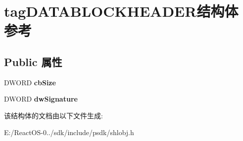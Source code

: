 \hypertarget{structtag_d_a_t_a_b_l_o_c_k_h_e_a_d_e_r}{}\section{tag\+D\+A\+T\+A\+B\+L\+O\+C\+K\+H\+E\+A\+D\+E\+R结构体 参考}
\label{structtag_d_a_t_a_b_l_o_c_k_h_e_a_d_e_r}
\subsection*{Public 属性}
\begin{DoxyCompactItemize}
\item 
\mbox{\label{structtag_d_a_t_a_b_l_o_c_k_h_e_a_d_e_r_a5060cbb80aae02e0176b8524fcfbf36a}} 
D\+W\+O\+RD {\bfseries cb\+Size}
\item 
\mbox{\label{structtag_d_a_t_a_b_l_o_c_k_h_e_a_d_e_r_a416862ce00e57edc1bfd2911d2003f2d}} 
D\+W\+O\+RD {\bfseries dw\+Signature}
\end{DoxyCompactItemize}


该结构体的文档由以下文件生成\+:\begin{DoxyCompactItemize}
\item 
E\+:/\+React\+O\+S-\/0../sdk/include/psdk/shlobj.\+h\end{DoxyCompactItemize}
